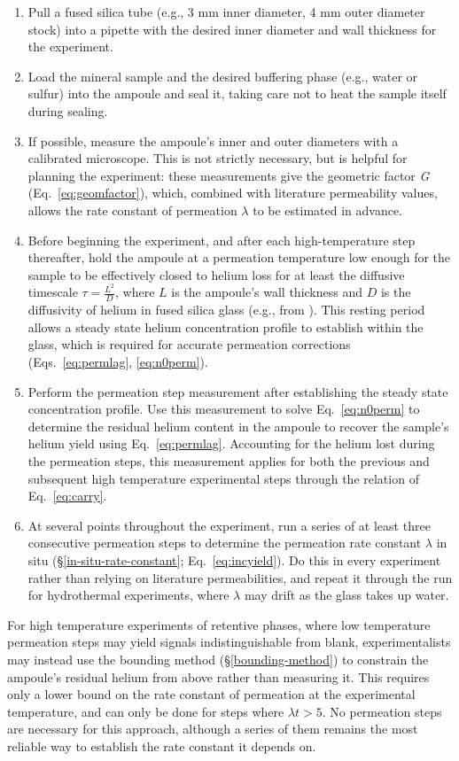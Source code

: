 \begin{enumerate}
  \item Pull a fused silica tube (e.g., 3 mm inner diameter, 4 mm outer diameter stock) into a pipette with the desired inner diameter and wall thickness for the experiment.
  \item Load the mineral sample and the desired buffering phase (e.g., water or sulfur) into the ampoule and seal it, taking care not to heat the sample itself during sealing.
  \item If possible, measure the ampoule's inner and outer diameters with a calibrated microscope. This is not strictly necessary, but is helpful for planning the experiment: these measurements give the geometric factor \emph{G} (Eq.~\eqref{eq:geomfactor}), which, combined with literature permeability values, allows the rate constant of permeation $\lambda$ to be estimated in advance.
  \item Before beginning the experiment, and after each high-temperature step thereafter, hold the ampoule at a permeation temperature low enough for the sample to be effectively closed to helium loss for at least the diffusive timescale \(\tau = \frac{L^{2}}{D}\), where \(L\) is the ampoule's wall thickness and \(D\) is the diffusivity of helium in fused silica glass (e.g., from \citealp{swets1961}). This resting period allows a steady state helium concentration profile to establish within the glass, which is required for accurate permeation corrections (Eqs.~\eqref{eq:permlag}, \eqref{eq:n0perm}).
  \item Perform the permeation step measurement after establishing the steady state concentration profile. Use this measurement to solve Eq.~\eqref{eq:n0perm} to determine the residual helium content in the ampoule to recover the sample's helium yield using Eq.~\eqref{eq:permlag}. Accounting for the helium lost during the permeation steps, this measurement applies for both the previous and subsequent high temperature experimental steps through the relation of Eq.~\eqref{eq:carry}.
  \item At several points throughout the experiment, run a series of at least three consecutive permeation steps to determine the permeation rate constant $\lambda$ in situ (\S\ref{in-situ-rate-constant}; Eq.~\eqref{eq:incyield}). Do this in every experiment rather than relying on literature permeabilities, and repeat it through the run for hydrothermal experiments, where $\lambda$ may drift as the glass takes up water.
\end{enumerate}

For high temperature experiments of retentive phases, where low temperature permeation steps may yield signals indistinguishable from blank, experimentalists may instead use the bounding method (\S\ref{bounding-method}) to constrain the ampoule's residual helium from above rather than measuring it. This requires only a lower bound on the rate constant of permeation at the experimental temperature, and can only be done for steps where $\lambda t > 5$. No permeation steps are necessary for this approach, although a series of them remains the most reliable way to establish the rate constant it depends on.